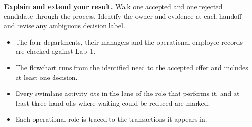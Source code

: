 

\begin{verification}
\textbf{Explain and extend your result.} Walk one accepted and one rejected candidate through the process. Identify the owner and evidence at each handoff and revise any ambiguous decision label.


\begin{itemize}
  \item The four departments, their managers and the operational employee records are checked against Lab~1.
  \item The flowchart runs from the identified need to the accepted offer and includes at least one decision.
  \item Every swimlane activity sits in the lane of the role that performs it, and at least three hand-offs where waiting could be reduced are marked.
  \item Each operational role is traced to the transactions it appears in.
\end{itemize}
\end{verification}
